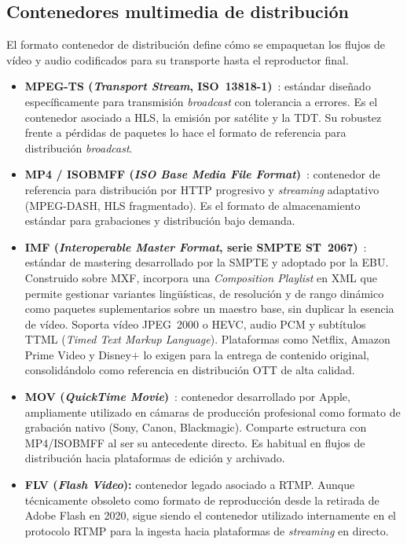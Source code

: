 \subsection{Contenedores multimedia de distribución}

El formato contenedor de distribución define cómo se empaquetan los flujos de vídeo y
audio codificados para su transporte hasta el reproductor final.

\begin{itemize}
  \item \textbf{MPEG-TS (\textit{Transport Stream}, ISO~13818-1)}~\cite{iso_mpegts}:
  estándar diseñado específicamente para transmisión \textit{broadcast} con tolerancia a errores.
  Es el contenedor asociado a HLS, la emisión por satélite y la \ac{TDT}. Su robustez frente
  a pérdidas de paquetes lo hace el formato de referencia para distribución \textit{broadcast}.

  \item \textbf{MP4 / ISOBMFF (\textit{ISO Base Media File Format})}~\cite{iso_isobmff}:
  contenedor de referencia para distribución por HTTP progresivo y \textit{streaming} adaptativo
  (MPEG-DASH, HLS fragmentado). Es el formato de almacenamiento estándar para
  grabaciones y distribución bajo demanda.

  \item \textbf{IMF (\textit{Interoperable Master Format}, serie SMPTE ST~2067)}~\cite{smpte_ov2067_0}:
  estándar de mastering desarrollado por la \acs{SMPTE} y adoptado por la \ac{EBU}. Construido sobre MXF,
  incorpora una \textit{Composition Playlist} en XML que permite gestionar variantes lingüísticas,
  de resolución y de rango dinámico como paquetes suplementarios sobre un maestro base, sin
  duplicar la esencia de vídeo. Soporta vídeo JPEG~2000 o HEVC, audio PCM y subtítulos TTML (\textit{Timed Text Markup Language}).
  Plataformas como Netflix, Amazon Prime Video y Disney$+$ lo exigen para la entrega de contenido
  original, consolidándolo como referencia en distribución \ac{OTT} de alta calidad.

  \item \textbf{MOV (\textit{QuickTime Movie})}~\cite{apple_quicktime}: contenedor
  desarrollado por Apple, ampliamente utilizado en cámaras de producción profesional
  como formato de grabación nativo (Sony, Canon, Blackmagic). Comparte estructura
  con MP4/ISOBMFF al ser su antecedente directo. Es habitual en flujos de distribución
  hacia plataformas de edición y archivado.

  \item \textbf{FLV (\textit{Flash Video}):} contenedor legado asociado a RTMP. Aunque
  técnicamente obsoleto como formato de reproducción desde la retirada de Adobe Flash en
  2020, sigue siendo el contenedor utilizado internamente en el protocolo RTMP para la
  ingesta hacia plataformas de \textit{streaming} en directo.
\end{itemize}

